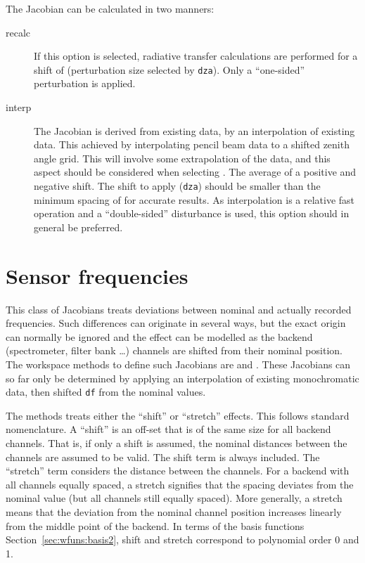 The Jacobian can be calculated in two manners:
\begin{description}
\item[recalc] If this option is selected, radiative transfer calculations are
  performed for a shift of  (perturbation size selected
  by \verb|dza|). Only a ``one-sided'' perturbation is applied.
\item[interp] The Jacobian is derived from existing data, by an interpolation
  of existing data. This achieved by interpolating pencil beam data to a
  shifted zenith angle grid. This will involve some extrapolation of the data,
  and this aspect should be considered when selecting
  . The average of a positive and negative shift.
  The shift to apply (\verb|dza|) should be smaller than the minimum spacing of
   for accurate results. As interpolation is a
  relative fast operation and a ``double-sided'' disturbance is used, this
  option should in general be preferred.
\end{description}




\section{Sensor frequencies}
\label{sec:wfuns:sensorfreq}

This class of Jacobians treats deviations between nominal and actually recorded
frequencies. Such differences can originate in several ways, but the exact
origin can normally be ignored and the effect can be modelled as the backend
(spectrometer, filter bank \dots) channels are shifted from their nominal
position. The workspace methods to define such Jacobians are
 and . These
Jacobians can so far only be determined by applying an interpolation of existing
monochromatic data, then shifted \verb|df| from the nominal
values.

The methods treats either the ``shift'' or ``stretch'' effects. This follows
standard nomenclature. A ``shift'' is an off-set that is of the same size for
all backend channels. That is, if only a shift is assumed, the nominal
distances between the channels are assumed to be valid. The shift term is
always included. The ``stretch'' term considers the distance between the
channels. For a backend with all channels equally spaced, a stretch signifies
that the spacing deviates from the nominal value (but all channels still
equally spaced). More generally, a stretch means that the deviation from the
nominal channel position increases linearly from the middle point of the
backend. In terms of the basis functions Section~\ref{sec:wfuns:basis2}, shift
and stretch correspond to polynomial order 0 and 1.

